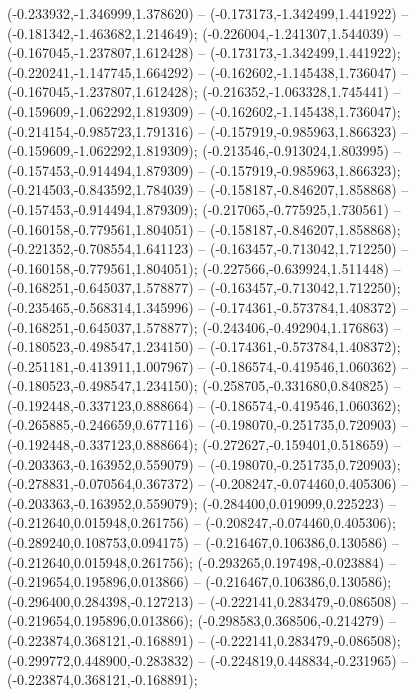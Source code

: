  (-0.233932,-1.346999,1.378620) -- (-0.173173,-1.342499,1.441922) -- (-0.181342,-1.463682,1.214649);
 (-0.226004,-1.241307,1.544039) -- (-0.167045,-1.237807,1.612428) -- (-0.173173,-1.342499,1.441922);
 (-0.220241,-1.147745,1.664292) -- (-0.162602,-1.145438,1.736047) -- (-0.167045,-1.237807,1.612428);
 (-0.216352,-1.063328,1.745441) -- (-0.159609,-1.062292,1.819309) -- (-0.162602,-1.145438,1.736047);
 (-0.214154,-0.985723,1.791316) -- (-0.157919,-0.985963,1.866323) -- (-0.159609,-1.062292,1.819309);
 (-0.213546,-0.913024,1.803995) -- (-0.157453,-0.914494,1.879309) -- (-0.157919,-0.985963,1.866323);
 (-0.214503,-0.843592,1.784039) -- (-0.158187,-0.846207,1.858868) -- (-0.157453,-0.914494,1.879309);
 (-0.217065,-0.775925,1.730561) -- (-0.160158,-0.779561,1.804051) -- (-0.158187,-0.846207,1.858868);
 (-0.221352,-0.708554,1.641123) -- (-0.163457,-0.713042,1.712250) -- (-0.160158,-0.779561,1.804051);
 (-0.227566,-0.639924,1.511448) -- (-0.168251,-0.645037,1.578877) -- (-0.163457,-0.713042,1.712250);
 (-0.235465,-0.568314,1.345996) -- (-0.174361,-0.573784,1.408372) -- (-0.168251,-0.645037,1.578877);
 (-0.243406,-0.492904,1.176863) -- (-0.180523,-0.498547,1.234150) -- (-0.174361,-0.573784,1.408372);
 (-0.251181,-0.413911,1.007967) -- (-0.186574,-0.419546,1.060362) -- (-0.180523,-0.498547,1.234150);
 (-0.258705,-0.331680,0.840825) -- (-0.192448,-0.337123,0.888664) -- (-0.186574,-0.419546,1.060362);
 (-0.265885,-0.246659,0.677116) -- (-0.198070,-0.251735,0.720903) -- (-0.192448,-0.337123,0.888664);
 (-0.272627,-0.159401,0.518659) -- (-0.203363,-0.163952,0.559079) -- (-0.198070,-0.251735,0.720903);
 (-0.278831,-0.070564,0.367372) -- (-0.208247,-0.074460,0.405306) -- (-0.203363,-0.163952,0.559079);
 (-0.284400,0.019099,0.225223) -- (-0.212640,0.015948,0.261756) -- (-0.208247,-0.074460,0.405306);
 (-0.289240,0.108753,0.094175) -- (-0.216467,0.106386,0.130586) -- (-0.212640,0.015948,0.261756);
 (-0.293265,0.197498,-0.023884) -- (-0.219654,0.195896,0.013866) -- (-0.216467,0.106386,0.130586);
 (-0.296400,0.284398,-0.127213) -- (-0.222141,0.283479,-0.086508) -- (-0.219654,0.195896,0.013866);
 (-0.298583,0.368506,-0.214279) -- (-0.223874,0.368121,-0.168891) -- (-0.222141,0.283479,-0.086508);
 (-0.299772,0.448900,-0.283832) -- (-0.224819,0.448834,-0.231965) -- (-0.223874,0.368121,-0.168891);
